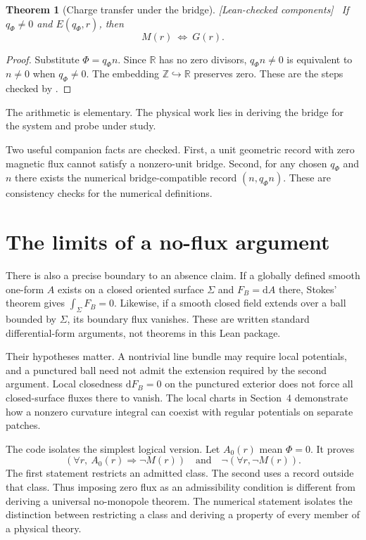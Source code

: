 \documentclass[11pt]{article}
\newtheorem{theorem}{Theorem}[section]
\theoremstyle{definition}\newtheorem{definition}[theorem]{Definition}
\theoremstyle{remark}\newtheorem{remark}[theorem]{Remark}
\newcommand{\dd}{\mathrm{d}}
\newcommand{\R}{\mathbb{R}}
\newcommand{\Z}{\mathbb{Z}}
\newcommand{\checked}{\textnormal{\small[Lean-checked components]}\ }
\newcommand{\leanname}[1]{\texttt{\small\detokenize{#1}}}
\begin{document}
\begin{theorem}[Charge transfer under the bridge]\label{thm:transfer}\checked
If $q_\Phi\neq0$ and $E(q_\Phi,r)$, then
\begin{equation}\label{eq:iff}
 M(r)\ \Longleftrightarrow\ G(r).
\end{equation}
\end{theorem}
\begin{proof}
Substitute $\Phi=q_\Phi n$. Since $\R$ has no zero divisors, $q_\Phi n\neq0$ is equivalent to $n\neq0$ when $q_\Phi\neq0$. The embedding $\Z\hookrightarrow\R$ preserves zero. These are the steps checked by \leanname{bridge_transfers_charge}.
\end{proof}
The arithmetic is elementary. The physical work lies in deriving the bridge for the system and probe under study.

Two useful companion facts are checked. First, a unit geometric record with zero magnetic flux cannot satisfy a nonzero-unit bridge. Second, for any chosen $q_\Phi$ and $n$ there exists the numerical bridge-compatible record $(n,q_\Phi n)$. These are consistency checks for the numerical definitions.

\section{The limits of a no-flux argument}
There is also a precise boundary to an absence claim. If a globally defined smooth one-form $A$ exists on a closed oriented surface $\Sigma$ and $F_B=\dd A$ there, Stokes' theorem gives $\int_\Sigma F_B=0$. Likewise, if a smooth closed field extends over a ball bounded by $\Sigma$, its boundary flux vanishes. These are written standard differential-form arguments, not theorems in this Lean package.

Their hypotheses matter. A nontrivial line bundle may require local potentials, and a punctured ball need not admit the extension required by the second argument. Local closedness $\dd F_B=0$ on the punctured exterior does not force all closed-surface fluxes there to vanish. The local charts in Section~4 demonstrate how a nonzero curvature integral can coexist with regular potentials on separate patches.

The code isolates the simplest logical version. Let $A_0(r)$ mean $\Phi=0$. It proves
\begin{equation}\label{eq:admiss}
 (\forall r,\ A_0(r)\Rightarrow\neg M(r))
 \quad\text{and}\quad
 \neg(\forall r,\neg M(r)).
\end{equation}
The first statement restricts an admitted class. The second uses a record outside that class. Thus imposing zero flux as an admissibility condition is different from deriving a universal no-monopole theorem. The numerical statement isolates the distinction between restricting a class and deriving a property of every member of a physical theory.
\end{document}
